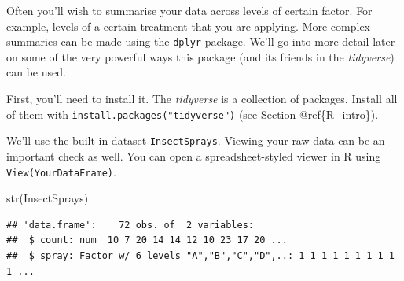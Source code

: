 \documentclass[
  11pt,
  a4paper,
]{book}
\newenvironment{Shaded}{\begin{snugshade}}{\end{snugshade}}
\newcommand{\CommentTok}[1]{\textcolor[rgb]{0.56,0.35,0.01}{\textit{#1}}}
\newcommand{\DecValTok}[1]{\textcolor[rgb]{0.00,0.00,0.81}{#1}}
\newcommand{\FunctionTok}[1]{\textcolor[rgb]{0.00,0.00,0.00}{#1}}
\newcommand{\NormalTok}[1]{#1}
\newcommand{\SpecialCharTok}[1]{\textcolor[rgb]{0.00,0.00,0.00}{#1}}
\newcommand{\StringTok}[1]{\textcolor[rgb]{0.31,0.60,0.02}{#1}}
\begin{document}
\begin{Shaded}
\end{Shaded}

\begin{Shaded}
\end{Shaded}

Often you'll wish to summarise your data across levels of certain factor. For example, levels of a certain treatment that you are applying. More complex summaries can be made using the \texttt{dplyr} package. We'll go into more detail later on some of the very powerful ways this package (and its friends in the \emph{tidyverse}) can be used.

First, you'll need to install it. The \emph{tidyverse} is a collection of packages. Install all of them with \texttt{install.packages("tidyverse")} (see Section @ref\{R\_intro\}).

We'll use the built-in dataset \texttt{InsectSprays}. Viewing your raw data can be an important check as well. You can open a spreadsheet-styled viewer in R using \texttt{View(YourDataFrame)}.

\begin{Shaded}
\begin{Highlighting}[]
\FunctionTok{str}\NormalTok{(InsectSprays)}
\end{Highlighting}
\end{Shaded}

\begin{verbatim}
## 'data.frame':    72 obs. of  2 variables:
##  $ count: num  10 7 20 14 14 12 10 23 17 20 ...
##  $ spray: Factor w/ 6 levels "A","B","C","D",..: 1 1 1 1 1 1 1 1 1 1 ...
\end{verbatim}
\end{document}
